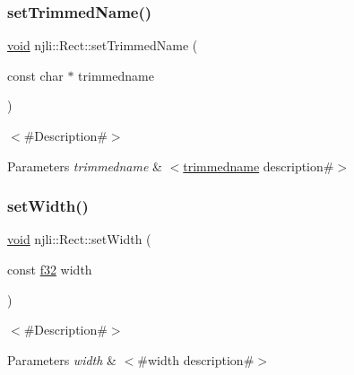 \mbox{\label{classnjli_1_1_rect_ae3d08571cf5301cb45b6aa5d1f7d0d56}} 
\subsubsection{\texorpdfstring{set\+Trimmed\+Name()}{setTrimmedName()}}
{\footnotesize\ttfamily \mbox{\hyperlink{_thread_8h_af1e856da2e658414cb2456cb6f7ebc66}{void}} njli\+::\+Rect\+::set\+Trimmed\+Name (\begin{DoxyParamCaption}\item[{const char $\ast$}]{trimmedname }\end{DoxyParamCaption})}

$<$\#\+Description\#$>$


\begin{DoxyParams}{Parameters}
{\em trimmedname} & $<$\mbox{\hyperlink{classnjli_1_1_rect_a2caf9b5b79ddae7f604841cfdbbbb93f}{trimmedname}} description\#$>$ \\
\hline
\end{DoxyParams}
\mbox{\label{classnjli_1_1_rect_a4d2d37a28ab1395b9fa4c1074736b7a1}} 
\subsubsection{\texorpdfstring{set\+Width()}{setWidth()}}
{\footnotesize\ttfamily \mbox{\hyperlink{_thread_8h_af1e856da2e658414cb2456cb6f7ebc66}{void}} njli\+::\+Rect\+::set\+Width (\begin{DoxyParamCaption}\item[{const \mbox{\hyperlink{_util_8h_a5f6906312a689f27d70e9d086649d3fd}{f32}}}]{width }\end{DoxyParamCaption})}

$<$\#\+Description\#$>$


\begin{DoxyParams}{Parameters}
{\em width} & $<$\#width description\#$>$ \\
\hline
\end{DoxyParams}
\mbox{\label{classnjli_1_1_rect_a793503fbc0a2568486dafe8da98c0304}} 
